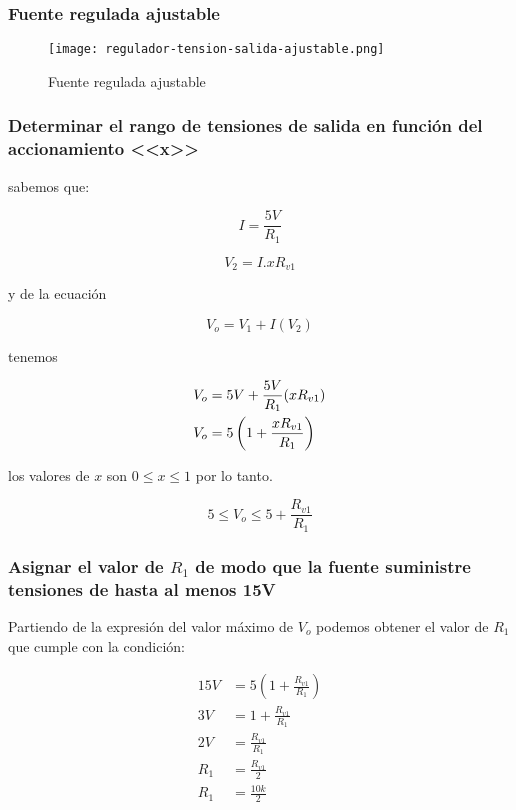 \subsubsection{Fuente regulada ajustable}

\begin{figure}[ht]
    \centering
    \texttt{[image: regulador-tension-salida-ajustable.png]}
    \caption{Fuente regulada ajustable}
    \label{fig:regulador-tension-salida-ajustable}
\end{figure}

\subsubsection*{Determinar el rango de tensiones de salida en función del accionamiento <<x>>}

sabemos que:

$$ I = \frac{5 V}{R_1}$$

$$ V_2 = I . x R_{v1}$$

y de la ecuación

\begin{equation}
    V_o = V_1 + I(V_2)
\end{equation}
 
tenemos 

\begin{align*}
    V_o &= 5V + \frac{5 V}{R_1} (x R_{v1}) \\
    V_o &= 5 \left( 1 + \frac{x R_{v1}}{R_{1}} \right) \\
\end{align*}

los valores de $x$ son $ 0 \leq x \leq 1$ por lo tanto.

\begin{equation}
    5 \leq V_o \leq 5 + \frac{R_{v1}}{R_{1}}
\end{equation}

\subsubsection*{Asignar el valor de $R_1$ de modo que la fuente suministre tensiones de hasta al menos 15V}

Partiendo de la expresión del valor máximo de $V_o$ podemos obtener el valor de $R_1$ que cumple con la condición:

\begin{align*}
    15V &= 5(1 + \frac{R_{v1}}{R_{1}}) \\
    3V &= 1 + \frac{R_{v1}}{R_{1}} \\
    2V &= \frac{R_{v1}}{R_{1}} \\
    R_{1} &= \frac{R_{v1}}{2} \\
    R_{1} &=  \frac{10k}{2} \\
\end{align*}

